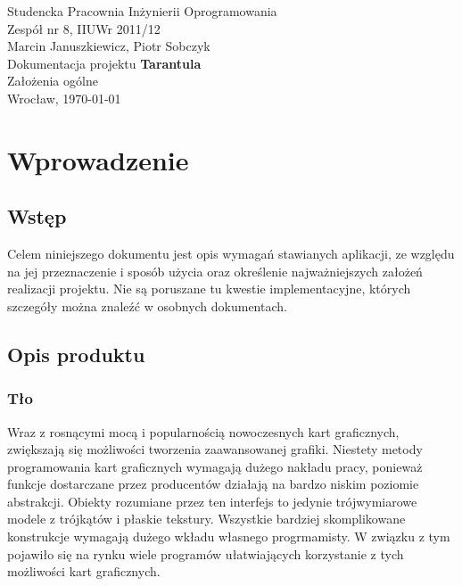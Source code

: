 \documentclass[11pt,leqno]{article}
\begin{document}
\begin{center}
\thispagestyle{empty}
{\Large Studencka Pracownia Inżynierii Oprogramowania}\\[0.5cm]
{\Large Zespół nr 8, IIUWr 2011/12}\\[2.5cm]

{Marcin Januszkiewicz, Piotr Sobczyk}\\[0.5cm]
{\huge Dokumentacja projektu \textbf{Tarantula}}\\[0.25cm]
{ Założenia ogólne}\\[0.5cm]
\vfill
{\large Wrocław, \today}
\end{center}
\newpage
\tableofcontents

\newpage


\newpage
\section{Wprowadzenie}

\subsection{Wstęp}
Celem niniejszego dokumentu jest opis wymagań stawianych aplikacji, ze względu na jej przeznaczenie i 
sposób użycia oraz określenie najważniejszych założeń realizacji projektu. 
Nie są poruszane tu kwestie implementacyjne, których szczegóły można znaleźć w osobnych dokumentach.

\subsection{Opis produktu}

\subsubsection{Tło}

Wraz z rosnącymi mocą i popularnością nowoczesnych kart graficznych, zwiększają się możliwości tworzenia zaawansowanej grafiki. 
Niestety metody programowania kart graficznych wymagają dużego nakładu pracy, ponieważ funkcje dostarczane przez producentów 
działają na bardzo niskim poziomie abstrakcji. Obiekty rozumiane przez ten interfejs to jedynie trójwymiarowe modele z trójkątów i płaskie tekstury. 
Wszystkie bardziej skomplikowane konstrukcje wymagają dużego wkładu własnego progrmamisty. W związku z tym pojawiło się na rynku wiele programów 
ułatwiających korzystanie z tych możliwości kart graficznych. 
\end{document}
